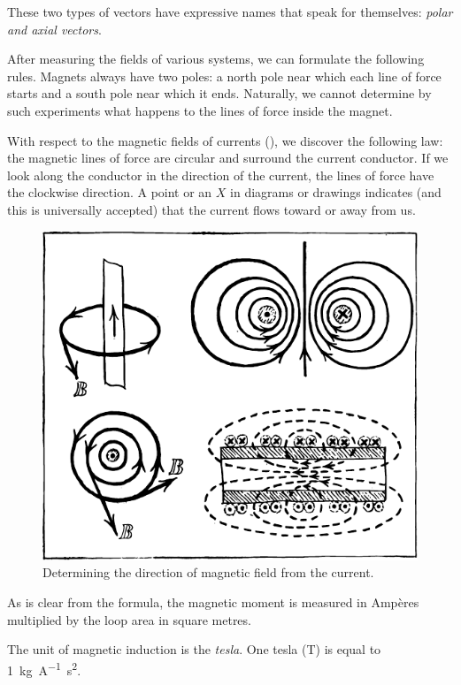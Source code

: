 These two types of vectors have expressive names that speak for themselves: \emph{polar and axial vectors}.

After measuring the fields of various systems, we can formulate the following rules. Magnets always have two poles: a north pole near which each line of force starts and a south pole near which it ends. Naturally, we cannot determine by such experiments what happens to the lines of force inside the magnet.

With respect to the magnetic fields of currents (), we discover the following law: the magnetic lines of force are circular and surround the current conductor. If we look along the conductor in the direction of the current, the lines of force have the clockwise direction. A point or an $X$ in diagrams or drawings indicates (and this is universally accepted) that the current flows toward or away from us.
\begin{figure}[!ht]
\centering
\includegraphics[width=\textwidth]{figures/fig-03-02.pdf}
\caption{Determining the direction of magnetic field from the current.}
\label{fig-3.2}
\end{figure}

As is clear from the formula, the magnetic moment is measured in Amp\`eres multiplied by the loop area in square metres.

The unit of magnetic induction is the \emph{tesla}. One tesla (\si{\tesla}) is equal to \SI{1}{\kilo\gram\per\ampere\second\squared}.

